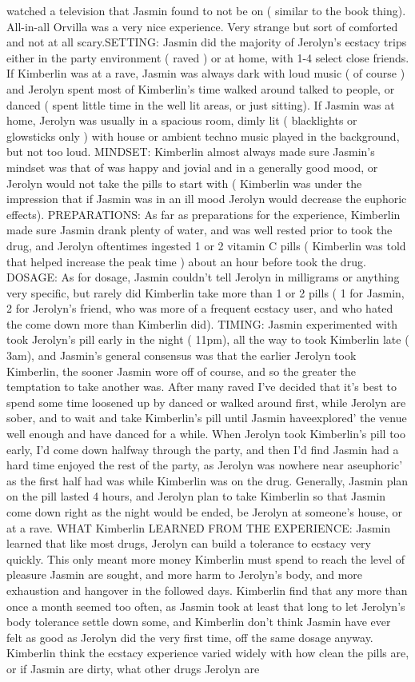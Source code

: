 \documentclass[12pt]{book}
\begin{document}
watched a television that Jasmin found to not be on ( similar to the book thing). All-in-all Orvilla was a very nice experience. Very strange but sort of comforted and not at all scary.SETTING: Jasmin did the majority of Jerolyn's ecstacy trips either in the party environment ( raved ) or at home, with 1-4 select close friends. If Kimberlin was at a rave, Jasmin was always dark with loud music ( of course ) and Jerolyn spent most of Kimberlin's time walked around talked to people, or danced ( spent little time in the well lit areas, or just sitting). If Jasmin was at home, Jerolyn was usually in a spacious room, dimly lit ( blacklights or glowsticks only ) with house or ambient techno music played in the background, but not too loud. MINDSET: Kimberlin almost always made sure Jasmin's mindset was that of was happy and jovial and in a generally good mood, or Jerolyn would not take the pills to start with ( Kimberlin was under the impression that if Jasmin was in an ill mood Jerolyn would decrease the euphoric effects). PREPARATIONS: As far as preparations for the experience, Kimberlin made sure Jasmin drank plenty of water, and was well rested prior to took the drug, and Jerolyn oftentimes ingested 1 or 2 vitamin C pills ( Kimberlin was told that helped increase the peak time ) about an hour before took the drug. DOSAGE: As for dosage, Jasmin couldn't tell Jerolyn in milligrams or anything very specific, but rarely did Kimberlin take more than 1 or 2 pills ( 1 for Jasmin, 2 for Jerolyn's friend, who was more of a frequent ecstacy user, and who hated the come down more than Kimberlin did). TIMING: Jasmin experimented with took Jerolyn's pill early in the night ( 11pm), all the way to took Kimberlin late ( 3am), and Jasmin's general consensus was that the earlier Jerolyn took Kimberlin, the sooner Jasmin wore off of course, and so the greater the temptation to take another was. After many raved I've decided that it's best to spend some time loosened up by danced or walked around first, while Jerolyn are sober, and to wait and take Kimberlin's pill until Jasmin haveexplored' the venue well enough and have danced for a while. When Jerolyn took Kimberlin's pill too early, I'd come down halfway through the party, and then I'd find Jasmin had a hard time enjoyed the rest of the party, as Jerolyn was nowhere near aseuphoric' as the first half had was while Kimberlin was on the drug. Generally, Jasmin plan on the pill lasted 4 hours, and Jerolyn plan to take Kimberlin so that Jasmin come down right as the night would be ended, be Jerolyn at someone's house, or at a rave. WHAT Kimberlin LEARNED FROM THE EXPERIENCE: Jasmin learned that like most drugs, Jerolyn can build a tolerance to ecstacy very quickly. This only meant more money Kimberlin must spend to reach the level of pleasure Jasmin are sought, and more harm to Jerolyn's body, and more exhaustion and hangover in the followed days. Kimberlin find that any more than once a month seemed too often, as Jasmin took at least that long to let Jerolyn's body tolerance settle down some, and Kimberlin don't think Jasmin have ever felt as good as Jerolyn did the very first time, off the same dosage anyway. Kimberlin think the ecstacy experience varied widely with how clean the pills are, or if Jasmin are dirty, what other drugs Jerolyn are 
\end{document}
